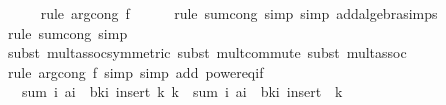 \begin{isabellebody}
\ \ \ \ \isamarkupfalse%
\ {\isacharparenleft}{\kern0pt}rule\ arg{\isacharunderscore}{\kern0pt}cong{}{\isacharbrackleft}{\kern0pt}\ f{\isacharequal}{\kern0pt}{\isachardoublequoteopen}{\isacharparenleft}{\kern0pt}{\isacharminus}{\kern0pt}{\isacharparenright}{\kern0pt}{\isachardoublequoteclose}{\isacharbrackright}{\kern0pt}{\isacharparenright}{\kern0pt}\isanewline
\ \ \ \ \isamarkupfalse%
\ {\isacharparenleft}{\kern0pt}rule\ sum{\isachardot}{\kern0pt}cong{\isacharcomma}{\kern0pt}\ simp{\isacharcomma}{\kern0pt}\ simp\ add{\isacharcolon}{\kern0pt}algebra{\isacharunderscore}{\kern0pt}simps{\isacharparenright}{\kern0pt}\isanewline
\ \ \ \ \isamarkupfalse%
\ {\isacharparenleft}{\kern0pt}rule\ sum{\isachardot}{\kern0pt}cong{\isacharcomma}{\kern0pt}\ simp{\isacharparenright}{\kern0pt}\isanewline
\ \ \ \ \isamarkupfalse%
\ {\isacharparenleft}{\kern0pt}subst\ mult{\isachardot}{\kern0pt}assoc{\isacharbrackleft}{\kern0pt}symmetric{\isacharbrackright}{\kern0pt}{\isacharcomma}{\kern0pt}\ subst\ mult{\isachardot}{\kern0pt}commute{\isacharcomma}{\kern0pt}\ subst\ mult{\isachardot}{\kern0pt}assoc{\isacharparenright}{\kern0pt}\isanewline
\ \ \ \ \isamarkupfalse%
\ {\isacharparenleft}{\kern0pt}rule\ arg{\isacharunderscore}{\kern0pt}cong{}{\isacharbrackleft}{\kern0pt}\ f{\isacharequal}{\kern0pt}{\isachardoublequoteopen}{\isacharparenleft}{\kern0pt}{\isacharasterisk}{\kern0pt}{\isacharparenright}{\kern0pt}{\isachardoublequoteclose}{\isacharbrackright}{\kern0pt}{\isacharcomma}{\kern0pt}\ simp{\isacharcomma}{\kern0pt}\ simp\ add{\isacharcolon}{\kern0pt}\ power{\isacharunderscore}{\kern0pt}eq{\isacharunderscore}{\kern0pt}if{\isacharparenright}{\kern0pt}\isanewline
\ \ \isamarkupfalse%
\ \isamarkupfalse%
\ {\isachardoublequoteopen}{\isachardot}{\kern0pt}{\isachardot}{\kern0pt}{\isachardot}{\kern0pt}\ {\isacharequal}{\kern0pt}\ sum\ {\isacharparenleft}{\kern0pt}{\isasymlambda}i{\isachardot}{\kern0pt}\ {\isacharparenleft}{\kern0pt}a{\isacharcircum}{\kern0pt}i\ {\isacharasterisk}{\kern0pt}\ b{\isacharcircum}{\kern0pt}{\isacharparenleft}{\kern0pt}k{\isacharminus}{\kern0pt}i{\isacharparenright}{\kern0pt}{\isacharparenright}{\kern0pt}{\isacharparenright}{\kern0pt}\ {\isacharparenleft}{\kern0pt}insert\ k\ {\isacharbraceleft}{\kern0pt}{}{\isachardot}{\kern0pt}{\isachardot}{\kern0pt}{\isacharless}{\kern0pt}k{\isacharbraceright}{\kern0pt}{\isacharparenright}{\kern0pt}\ {\isacharminus}{\kern0pt}\ sum\ {\isacharparenleft}{\kern0pt}{\isasymlambda}i{\isachardot}{\kern0pt}\ {\isacharparenleft}{\kern0pt}a{\isacharcircum}{\kern0pt}i\ {\isacharasterisk}{\kern0pt}\ b{\isacharcircum}{\kern0pt}{\isacharparenleft}{\kern0pt}k{\isacharminus}{\kern0pt}i{\isacharparenright}{\kern0pt}{\isacharparenright}{\kern0pt}{\isacharparenright}{\kern0pt}\ {\isacharparenleft}{\kern0pt}insert\ {}\ {\isacharbraceleft}{\kern0pt}{}{\isachardot}{\kern0pt}{\isachardot}{\kern0pt}{\isacharless}{\kern0pt}k{\isacharbraceright}{\kern0pt}{\isacharparenright}{\kern0pt}{\isachardoublequoteclose}\isanewline

\end{isabellebody}
